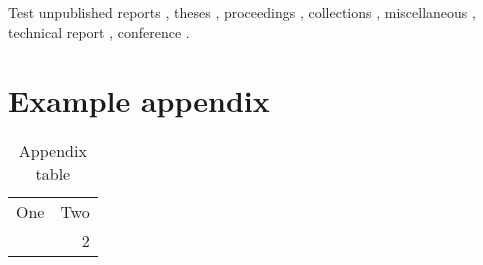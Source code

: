\documentclass{mpi-far}
\begin{document}
Test unpublished reports \citep{baker_census_2010},  theses \citep{carroll_rightwhale_2011},
proceedings \citep{bratten_working_1997}, 
collections \citep{gales_phocarctos_2008, sharp_sefra_2017},
miscellaneous \citep{delevie_hot_2014},
technical report \citep{helidoniotis_testing_2015}, conference \citep{newman_population_2008}.



\clearpage
\printbibliography

\clearpage
\newpage
\appendices
\section{Example appendix}

\begin{table}[h]
\caption{Appendix table}
\begin{center}
\begin{tabular}{rr}
One & Two \\ \addlinespace
1 & 2
\end{tabular}
\end{center}
\end{table}
\end{document}
